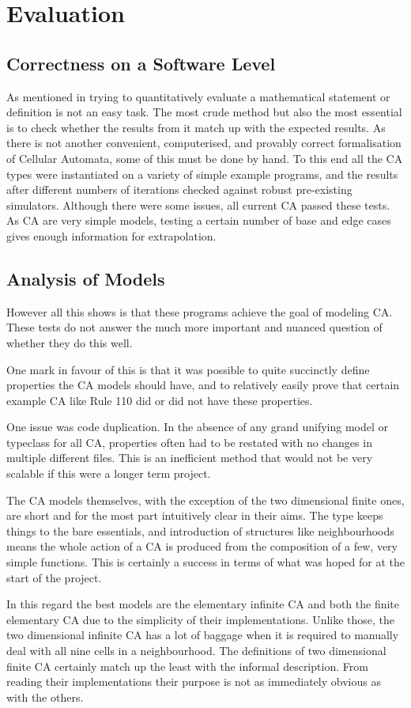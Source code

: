 \chapter{Evaluation}

\section{Correctness on a Software Level}

As mentioned in  trying to quantitatively evaluate a mathematical statement or definition is not an easy task.
The most crude method but also the most essential is to check whether the results from it match up with the expected results.
As there is not another convenient, computerised, and provably correct formalisation of Cellular Automata,
some of this must be done by hand.
To this end all the CA types were instantiated on a variety of simple example programs, 
and the results after different numbers of iterations checked against robust pre-existing simulators.
Although there were some issues, 
all current CA passed these tests.
As CA are very simple models,
testing a certain number of base and edge cases gives enough information for extrapolation.


\section{Analysis of Models}
However all this shows is that these programs achieve the goal of modeling CA.
These tests do not answer the much more important and nuanced question of whether they do this well.

One mark in favour of this is that it was possible to quite succinctly define properties the CA models should have,
and to relatively easily prove that certain example CA like Rule 110 did or did not have these properties.

One issue was code duplication.
In the absence of any grand unifying model or typeclass for all CA,
properties often had to be restated with no changes in multiple different files.
This is an inefficient method that would not be very scalable if this were a longer term project.

The CA models themselves,
with the exception of the two dimensional finite ones,
are short and for the most part intuitively clear in their aims.
The type keeps things to the bare essentials,
and introduction of structures like neighbourhoods means the whole action of a CA is produced from the composition of a few, very simple functions.
This is certainly a success in terms of what was hoped for at the start of the project.

In this regard the best models are the elementary infinite CA
and both the finite elementary CA due to the simplicity of their implementations.
Unlike those, the two dimensional infinite CA has a lot of baggage when it is required to manually deal with all nine cells in a neighbourhood.
The definitions of two dimensional finite CA certainly match up the least with the informal description.
From reading their implementations their purpose is not as immediately obvious as with the others.
